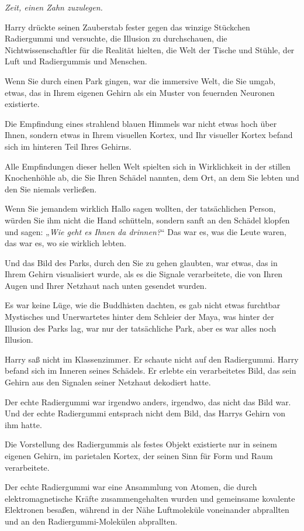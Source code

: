 {\emph{Zeit, einen Zahn zuzulegen.}

Harry drückte seinen Zauberstab fester gegen das winzige Stückchen Radiergummi und versuchte, die Illusion zu durchschauen, die Nichtwissenschaftler für die Realität hielten, die Welt der Tische und Stühle, der Luft und Radiergummis und Menschen.

Wenn Sie durch einen Park gingen, war die immersive Welt, die Sie umgab, etwas, das in Ihrem eigenen Gehirn als ein Muster von feuernden Neuronen existierte.

Die Empfindung eines strahlend blauen Himmels war nicht etwas hoch über Ihnen, sondern etwas in Ihrem visuellen Kortex, und Ihr visueller Kortex befand sich im hinteren Teil Ihres Gehirns.

Alle Empfindungen dieser hellen Welt spielten sich in Wirklichkeit in der stillen Knochenhöhle ab, die Sie Ihren Schädel nannten, dem Ort, an dem Sie lebten und den Sie niemals verließen.

Wenn Sie jemandem wirklich Hallo sagen wollten, der tatsächlichen Person, würden Sie ihm nicht die Hand schütteln, sondern sanft an den Schädel klopfen und sagen: „\emph{Wie geht es Ihnen da drinnen?}“ Das war es, was die Leute waren, das war es, wo sie wirklich lebten.

Und das Bild des Parks, durch den Sie zu gehen glaubten, war etwas, das in Ihrem Gehirn visualisiert wurde, als es die Signale verarbeitete, die von Ihren Augen und Ihrer Netzhaut nach unten gesendet wurden.

Es war keine Lüge, wie die Buddhisten dachten, es gab nicht etwas furchtbar Mystisches und Unerwartetes hinter dem Schleier der Maya, was hinter der Illusion des Parks lag, war nur der tatsächliche Park, aber es war alles noch Illusion.

Harry saß nicht im Klassenzimmer. Er schaute nicht auf den Radiergummi. Harry befand sich im Inneren seines Schädels. Er erlebte ein verarbeitetes Bild, das sein Gehirn aus den Signalen seiner Netzhaut dekodiert hatte.

Der echte Radiergummi war irgendwo anders, irgendwo, das nicht das Bild war. Und der echte Radiergummi entsprach nicht dem Bild, das Harrys Gehirn von ihm hatte.

Die Vorstellung des Radiergummis als festes Objekt existierte nur in seinem eigenen Gehirn, im parietalen Kortex, der seinen Sinn für Form und Raum verarbeitete.

Der echte Radiergummi war eine Ansammlung von Atomen, die durch elektromagnetische Kräfte zusammengehalten wurden und gemeinsame kovalente Elektronen besaßen, während in der Nähe Luftmoleküle voneinander abprallten und an den Radiergummi-Molekülen abprallten.

}
